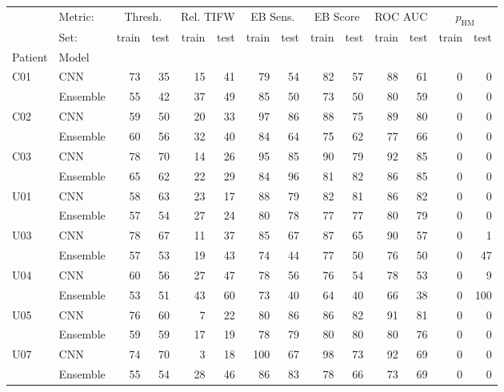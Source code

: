 \begin{tabular}{ll|rr|rr|rr|rr|rr|rr}
\toprule
 & Metric: & \multicolumn{2}{|c}{Thresh.} & \multicolumn{2}{|c}{Rel. TIFW} & \multicolumn{2}{|c}{EB Sens.} & \multicolumn{2}{|c}{EB Score} & \multicolumn{2}{|c}{ROC AUC} & \multicolumn{2}{|c}{$p_{\mathrm{HM}}$} \\
 & Set: & train & test & train & test & train & test & train & test & train & test & train & test \\
Patient & Model &  &  &  &  &  &  &  &  &  &  &  &  \\
\midrule
\multirow[t]{2}{*}{C01} & CNN & 73 & 35 & 15 & 41 & 79 & 54 & 82 & 57 & 88 & 61 & 0 & 0 \\
 & Ensemble & 55 & 42 & 37 & 49 & 85 & 50 & 73 & 50 & 80 & 59 & 0 & 0 \\
\cline{1-14}
\multirow[t]{2}{*}{C02} & CNN & 59 & 50 & 20 & 33 & 97 & 86 & 88 & 75 & 89 & 80 & 0 & 0 \\
 & Ensemble & 60 & 56 & 32 & 40 & 84 & 64 & 75 & 62 & 77 & 66 & 0 & 0 \\
\cline{1-14}
\multirow[t]{2}{*}{C03} & CNN & 78 & 70 & 14 & 26 & 95 & 85 & 90 & 79 & 92 & 85 & 0 & 0 \\
 & Ensemble & 65 & 62 & 22 & 29 & 84 & 96 & 81 & 82 & 86 & 85 & 0 & 0 \\
\cline{1-14}
\multirow[t]{2}{*}{U01} & CNN & 58 & 63 & 23 & 17 & 88 & 79 & 82 & 81 & 86 & 82 & 0 & 0 \\
 & Ensemble & 57 & 54 & 27 & 24 & 80 & 78 & 77 & 77 & 80 & 79 & 0 & 0 \\
\cline{1-14}
\multirow[t]{2}{*}{U03} & CNN & 78 & 67 & 11 & 37 & 85 & 67 & 87 & 65 & 90 & 57 & 0 & 1 \\
 & Ensemble & 57 & 53 & 19 & 43 & 74 & 44 & 77 & 50 & 76 & 50 & 0 & 47 \\
\cline{1-14}
\multirow[t]{2}{*}{U04} & CNN & 60 & 56 & 27 & 47 & 78 & 56 & 76 & 54 & 78 & 53 & 0 & 9 \\
 & Ensemble & 53 & 51 & 43 & 60 & 73 & 40 & 64 & 40 & 66 & 38 & 0 & 100 \\
\cline{1-14}
\multirow[t]{2}{*}{U05} & CNN & 76 & 60 & 7 & 22 & 80 & 86 & 86 & 82 & 91 & 81 & 0 & 0 \\
 & Ensemble & 59 & 59 & 17 & 19 & 78 & 79 & 80 & 80 & 80 & 76 & 0 & 0 \\
\cline{1-14}
\multirow[t]{2}{*}{U07} & CNN & 74 & 70 & 3 & 18 & 100 & 67 & 98 & 73 & 92 & 69 & 0 & 0 \\
 & Ensemble & 55 & 54 & 28 & 46 & 86 & 83 & 78 & 66 & 73 & 69 & 0 & 0 \\

\end{tabular}
